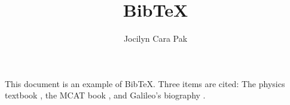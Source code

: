 \documentclass[a4paper,10pt]{article}
\title{BibTeX}
\author{Jocilyn Cara Pak}
\begin{document}
\maketitle

This document is an example of BibTeX. Three items are cited: The physics textbook \cite{Physics}, the MCAT book \cite{Examkrackers}, and Galileo's biography \cite{Galileo}.

\medskip


\end{document}

